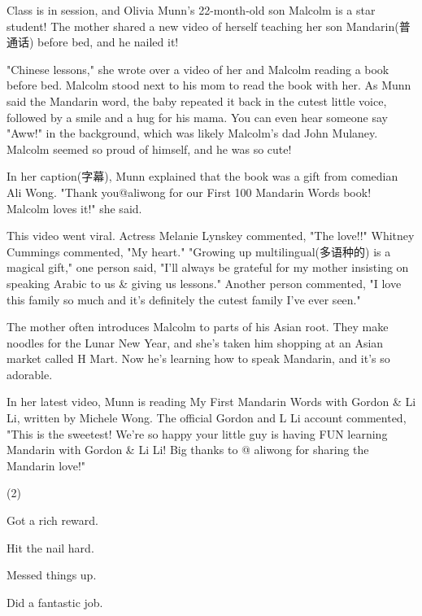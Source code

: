 \documentclass{英语试卷}
\begin{document}
\par Class is in session, and Olivia Munn's 22-month-old son Malcolm is a star student! The mother shared a new video of herself teaching her son Mandarin(普通话) before bed, and he nailed it!\par
\par "Chinese lessons," she wrote over a video of her and Malcolm reading a book before bed. Malcolm stood next to his mom to read the book with her. As Munn said the Mandarin word, the baby repeated it back in the cutest little voice, followed by a smile and a hug for his mama. You can even hear someone say "Aww!" in the background, which was likely Malcolm's dad John Mulaney. Malcolm seemed so proud of himself, and he was so cute!\par
\par In her caption(字幕), Munn explained that the book was a gift from comedian Ali Wong. "Thank you@aliwong for our First 100 Mandarin Words book! Malcolm loves it!" she said.\par
\par This video went viral. Actress Melanie Lynskey commented, "The love!!" Whitney Cummings commented, "My heart." "Growing up multilingual(多语种的) is a magical gift," one person said, "I’ll always be grateful for my mother insisting on speaking Arabic to us \& giving us lessons." Another person commented, "I love this family so much and it’s definitely the cutest family I’ve ever seen."\par
\par The mother often introduces Malcolm to parts of his Asian root. They make noodles for the Lunar New Year, and she's taken him shopping at an Asian market called H Mart. Now he's learning how to speak Mandarin, and it's so adorable.\par
\par In her latest video, Munn is reading My First Mandarin Words with Gordon \& Li Li, written by Michele Wong. The official Gordon and L Li account commented, "This is the sweetest! We're so happy your little guy is having FUN learning Mandarin with Gordon \& Li Li! Big thanks to @ aliwong for sharing the Mandarin love!"\par
{}
\begin{choices}(2)
  \item Got a rich reward.
  \item Hit the nail hard.
  \item Messed things up.
  \item Did a fantastic job.
\end{choices}
\end{document}
